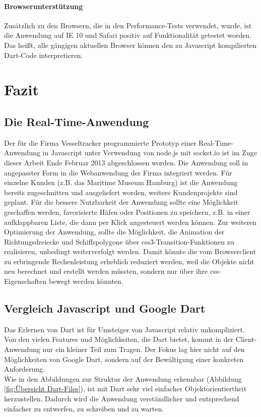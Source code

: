 \subsubsection{Browserunterstützung}
Zusätzlich zu den Browsern, die in den Performance-Tests verwendet, wurde, ist die Anwendung auf IE 10 und Safari positiv auf Funktionalität getestet worden. Das heißt, alle gängigen aktuellen Browser können den zu Javascript kompilierten Dart-Code interpretieren.
\chapter{Fazit}\label{Fazit}

\section{Die Real-Time-Anwendung}
Der für die Firma Vesseltracker programmierte Prototyp einer Real-Time-Anwendung in Javascript unter Verwendung von node.js mit socket.io ist im Zuge dieser Arbeit Ende Februar 2013 abgeschlossen worden. Die Anwendung soll in angepasster Form in die Webanwendung der Firma integriert werden. Für einzelne Kunden (z.B. das Maritime Museum Hamburg) ist die Anwendung bereits zugeschnitten und ausgeliefert worden, weitere Kundenprojekte sind geplant.
Für die bessere Nutzbarkeit der Anwendung sollte eine Möglichkeit geschaffen werden, favorisierte Häfen oder Positionen zu speichern, z.B. in einer aufklappbaren Liste, die dann per Klick angesteuert werden können.
Zur weiteren Optimierung der Anwendung, sollte die Möglichkeit, die Animation der Richtungsdreiecke und Schiffspolygone über css3-Transition-Funktionen zu realisieren, unbedingt weiterverfolgt werden. Damit könnte die vom Browserclient zu erbringende Rechenleistung erheblich reduziert werden, weil die Objekte nicht neu berechnet und erstellt werden müssten, sondern nur über ihre css-Eigenschaften bewegt werden könnten.

\section{Vergleich Javascript und Google Dart}
Das Erlernen von Dart ist für Umsteiger von Javascript relativ unkompliziert. Von den vielen Features und Möglichkeiten, die Dart bietet, kommt in der Client-Anwendung nur ein kleiner Teil zum Tragen. Der Fokus lag hier nicht auf den Möglichkeiten von Google Dart, sondern auf der Bewältigung einer konkreten Anforderung. \\
Wie in den Abbildungen zur Struktur der Anwendung erkennbar (Abbildung \ref{fig:Übersicht Dart-Files}), ist mit Dart sehr viel einfacher Objektorientiertheit herzustellen. Dadurch wird die Anwendung verständlicher und entsprechend einfacher zu entwerfen, zu schreiben und zu warten.

